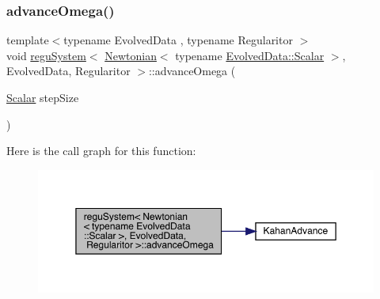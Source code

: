 \subsubsection{\texorpdfstring{advance\+Omega()}{advanceOmega()}}
{\footnotesize\ttfamily template$<$typename Evolved\+Data , typename Regularitor $>$ \\
void \mbox{\hyperlink{classregu_system}{regu\+System}}$<$ \mbox{\hyperlink{class_newtonian}{Newtonian}}$<$ typename \mbox{\hyperlink{classregu_system_aca8ee2c387943164ee3ea68370fc3ac0}{Evolved\+Data\+::\+Scalar}} $>$, Evolved\+Data, Regularitor $>$\+::advance\+Omega (\begin{DoxyParamCaption}\item[{\mbox{\hyperlink{classregu_system_3_01_newtonian_3_01typename_01_evolved_data_1_1_scalar_01_4_00_01_evolved_data_00_01_regularitor_01_4_a6993f135075541f441a7642845b183a5}{Scalar}}}]{step\+Size }\end{DoxyParamCaption})\hspace{0.3cm}{\ttfamily [private]}}

Here is the call graph for this function\+:
\nopagebreak
\begin{figure}[H]
\begin{center}
\leavevmode
\includegraphics[width=350pt]{classregu_system_3_01_newtonian_3_01typename_01_evolved_data_1_1_scalar_01_4_00_01_evolved_data_00_01_regularitor_01_4_a114c39dbc724ee6cda9f2b3da8d1ff3c_cgraph}
\end{center}
\end{figure}
\mbox{\label{classregu_system_3_01_newtonian_3_01typename_01_evolved_data_1_1_scalar_01_4_00_01_evolved_data_00_01_regularitor_01_4_ae0b6977439ce7171e5ef5767237e050d}} 

